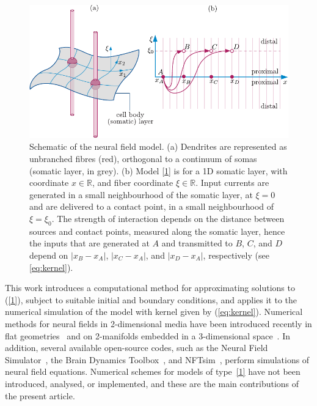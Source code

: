 \documentclass[a4paper,final]{siamart190516}
\newcommand{\Rb}{\mathbb{R}}
\begin{document}
\begin{figure}
  \centering
  \includegraphics{sketch}
  \caption{Schematic of the neural field model. (a) Dendrites are represented as
    unbranched fibres (red), orthogonal to a continuum of somas (somatic layer, in
    grey). (b) Model
    \eqref{1} is for a 1D somatic layer, with coordinate
$x \in \Rb$, and fiber coordinate $\xi \in \Rb$. Input currents are generated in a
small neighbourhood of the somatic layer, at $\xi=0$ and are delivered to a contact
point, in a small neighbourhood of $\xi = \xi_0$. The strength of interaction depends
on the distance between sources and contact points, measured along the somatic layer,
hence the inputs that are generated at $A$ and transmitted to $B$, $C$, and $D$ depend
on $|x_B - x_A|$, $|x_C-x_A|$, and $|x_D - x_A|$, respectively (see
\eqref{eq:kernel}).}
  \label{fig:sketch}
\end{figure}

This work introduces a computational method for approximating
solutions to (\ref{1}), subject to suitable initial and boundary conditions,
and applies it to the numerical simulation of the model with kernel given by
(\ref{eq:kernel}). Numerical methods for neural fields in 2-dimensional media have
been introduced recently in flat
geometries~\cite{Rankin2014,hutt2014numerical,lima2015numerical} and on 2-manifolds
embedded in a 3-dimensional space~\cite{Bojak2010,Visser:2017hy}. In addition,
several available open-source codes, such as the Neural Field
Simulator~\cite{Nichols2015}, the Brain Dynamics Toolbox~\cite{Heitmann}, and
NFTsim~\cite{SanzLeon2018}, perform simulations of neural field equations. Numerical
schemes for models of type~\eqref{1} have not been introduced, analysed, or
implemented, and these are the main contributions of the present article.
\end{document}
